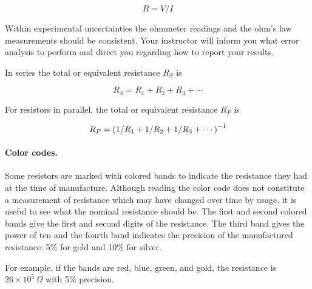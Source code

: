 \begin{multicols}{2}
\begin{equation} R = V/I \label{e:ohm} \end{equation}


Within experimental uncertainties the ohmmeter readings and the ohm's law measurements should be consistent.  Your instructor will inform you what error analysis to perform and direct you regarding how to report your results.

In series the total or equivalent resistance $R_S$ is 

\begin{equation} \label{e:ser}
	R_S  =  R_1  +  R_2  +  R_3  + \cdots	
\end{equation}

For resistors in parallel, the total or equivalent resistance $R_P$ is

\begin{equation} \label{e:par}
	R_P  =  \left (1/R_1  +  1/R_2  +  1/R_3  + \cdots \right)\relax^{-1}
\end{equation}

\paragraph {Color codes.}Some resistors are marked with colored bands to indicate the resistance they had at the time of manufacture.  Although reading the color code does not constitute a measurement of resistance which may have changed over time by usage, it is useful to see what the nominal resistance should be.  The first and second colored bands give the first and second digits of the resistance.  The third band gives the power of ten and the fourth band indicates the precision of the manufactured resistance:  5\% for gold and  10\% for silver.

For example, if the bands are red, blue, green, and gold, the resistance is $26 \times 10^5\,\Omega$ with 5\% precision.


\end{multicols}
